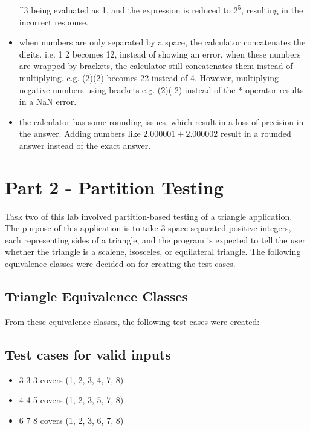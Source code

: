 \documentclass[letterpaper]{article}
\begin{document}
\begin{itemize}
          \textasciicircum 3
          being evaluated as 1, and the expression is reduced to $2^{5}$, resulting in the incorrect response.
    \item when numbers are only separated by a space, the calculator concatenates the digits. i.e. 1 2 becomes 12, instead of showing an error.
          when these numbers are wrapped by brackets, the calculator still concatenates them instead of multiplying. e.g. (2)(2) becomes 22 instead of 4.
          However, multiplying negative numbers using brackets e.g. (2)(-2) instead of the * operator results in a NaN error.
    \item the calculator has some rounding issues, which result in a loss of precision in the answer. Adding numbers like $2.000001+2.000002$ result in a rounded
          answer instead of the exact answer.
\end{itemize}

\section*{Part 2 - Partition Testing}
Task two of this lab involved partition-based testing of a triangle application.
The purpose of this application is to take 3 space separated positive integers,
each representing sides of a triangle, and the program is expected to tell the
user whether the triangle is a scalene, isosceles, or equilateral triangle.
The following equivalence classes were decided on for creating the test cases.
\subsection*{Triangle Equivalence Classes}


From these equivalence classes, the following test cases were created:

\subsection*{Test cases for valid inputs}
\begin{itemize}
    \item 3 3 3 covers (1, 2, 3, 4, 7, 8)
    \item 4 4 5 covers (1, 2, 3, 5, 7, 8)
    \item 6 7 8 covers (1, 2, 3, 6, 7, 8)
\end{itemize}
\end{document}
